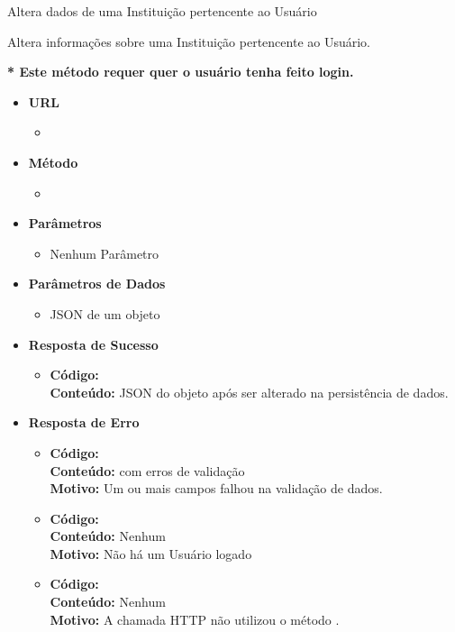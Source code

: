 \begin{caixa}{Altera dados de uma Instituição pertencente ao Usuário}{}

Altera informações sobre uma Instituição pertencente ao Usuário.

\textbf{* Este método requer quer o usuário tenha feito login.}

\begin{itemize}
\item \textbf{URL}
	\begin{itemize}
		\item {}
	\end{itemize}

\item \textbf{Método}
	\begin{itemize}
		\item {}
	\end{itemize}

\item \textbf{Parâmetros}
	\begin{itemize}
        \item Nenhum Parâmetro
	\end{itemize}

\item \textbf{Parâmetros de Dados}
	\begin{itemize}
		\item JSON de um objeto 
	\end{itemize}

\item \textbf{Resposta de Sucesso}
	\begin{itemize}
		\item \textbf{Código:}  \\ \textbf{Conteúdo:} JSON do objeto  após ser alterado na persistência de dados.
	\end{itemize}

\item \textbf{Resposta de Erro}
	\begin{itemize}
    	\item \textbf{Código:}  \\ \textbf{Conteúdo:}  com erros de validação \\ \textbf{Motivo:} Um ou mais campos falhou na validação de dados.
		\item \textbf{Código:}  \\ \textbf{Conteúdo:} Nenhum \\ \textbf{Motivo:} Não há um Usuário logado
        \item \textbf{Código:}  \\ \textbf{Conteúdo:} Nenhum \\ \textbf{Motivo:} A chamada HTTP não utilizou o método .
	\end{itemize}

\end{itemize}
\end{caixa}







